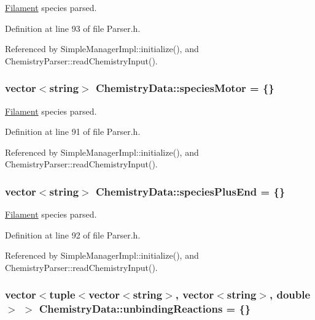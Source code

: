 \hyperlink{classFilament}{Filament} species parsed. 



Definition at line 93 of file Parser.\+h.



Referenced by Simple\+Manager\+Impl\+::initialize(), and Chemistry\+Parser\+::read\+Chemistry\+Input().

\hypertarget{structChemistryData_a273fd2565deae219bbd1fe3d557f53ba}{
\subsubsection[{species\+Motor}]{\setlength{\rightskip}{0pt plus 5cm}vector$<$string$>$ Chemistry\+Data\+::species\+Motor = \{\}}}\label{structChemistryData_a273fd2565deae219bbd1fe3d557f53ba}


\hyperlink{classFilament}{Filament} species parsed. 



Definition at line 91 of file Parser.\+h.



Referenced by Simple\+Manager\+Impl\+::initialize(), and Chemistry\+Parser\+::read\+Chemistry\+Input().

\hypertarget{structChemistryData_a627b89ad8dad87e03d249e5dc56eff5a}{
\subsubsection[{species\+Plus\+End}]{\setlength{\rightskip}{0pt plus 5cm}vector$<$string$>$ Chemistry\+Data\+::species\+Plus\+End = \{\}}}\label{structChemistryData_a627b89ad8dad87e03d249e5dc56eff5a}


\hyperlink{classFilament}{Filament} species parsed. 



Definition at line 92 of file Parser.\+h.



Referenced by Simple\+Manager\+Impl\+::initialize(), and Chemistry\+Parser\+::read\+Chemistry\+Input().

\hypertarget{structChemistryData_a0509ae76d9f3eef9f676c4c8fbab17e7}{
\subsubsection[{unbinding\+Reactions}]{\setlength{\rightskip}{0pt plus 5cm}vector$<$tuple$<$vector$<$string$>$, vector$<$string$>$, double$>$ $>$ Chemistry\+Data\+::unbinding\+Reactions = \{\}}}\label{structChemistryData_a0509ae76d9f3eef9f676c4c8fbab17e7}


